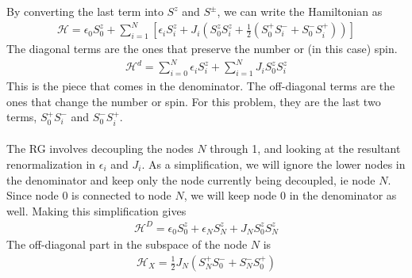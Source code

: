 \documentclass[twoside,11pt]{report}
\numberwithin{equation}{section}
\begin{document}
\\\\By converting the last term into \(S^z\) and \(S^\pm\), we can write the Hamiltonian as
\begin{equation}\begin{aligned}
	\mathcal{H} = \epsilon_0 S^z_0 + \sum_{i=1}^N\left[\epsilon_i S^z_i + J_i\left(S^z_0 S^z_i + \frac{1}{2}\left(S_0^+ S^-_i + S_0^- S^+_i\right)\right)\right]
\end{aligned}\end{equation}
The diagonal terms are the ones that preserve the number or (in this case) spin.
\begin{equation}\begin{aligned}
\mathcal{H}^d =\sum_{i=0}^N \epsilon_i S^z_i + \sum_{i=1}^N J_iS^z_0 S^z_i 
\end{aligned}\end{equation}
This is the piece that comes in the denominator. The off-diagonal terms are the ones that change the number or spin. For this problem, they are the last two terms, \(S_0^+ S_i^-\) and \(S_0^- S_i^+\).
\\\\The RG involves decoupling the nodes \(N\) through 1, and looking at the resultant renormalization in \(\epsilon_i\) and \(J_i\). As a simplification, we will ignore the lower nodes in the denominator and keep only the node currently being decoupled, ie node \(N\). Since node \(0\) is connected to node \(N\), we will keep node \(0\) in the denominator as well. Making this simplification gives
\begin{equation}\begin{aligned}
	\label{stardiag}
\mathcal{H}^D =\epsilon_0 S^z_0 + \epsilon_N S^z_N + J_NS^z_0 S^z_N 
\end{aligned}\end{equation}
The off-diagonal part in the subspace of the node \(N\) is
\begin{equation}\begin{aligned}
\mathcal{H}_X = \frac{1}{2}J_N \left(S_N^+ S_0^- + S_N^- S_0^+\right)
\end{aligned}\end{equation}
\end{document}

